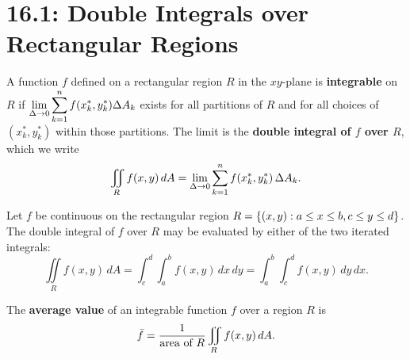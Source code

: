 \documentclass[mathNotesPreamble]{subfiles}
\begin{document}
\section{16.1: Double Integrals over Rectangular Regions}

  \begin{defn*}
    A function $f$ defined on a rectangular region $R$ in the $xy$-plane is \textbf{integrable} on $R$ if $\displaystyle\lim_{\Delta\to 0} \sum_{k=1}^n f(x_k^*, y_k^*) \Delta A_k$ exists for all partitions of $R$ and for all choices of $(x_k^*, y_k^*)$ within those partitions. The limit is the \textbf{double integral of $f$ over $R$}, which we write
      \[\iint\limits_R f(x,y)\,dA=\lim_{\Delta\to 0} \sum_{k=1}^n f(x_k^*, y_k^*)\,\Delta A_k.\]
  \end{defn*}

  \begin{thmBox*}
    Let $f$ be continuous on the rectangular region $R={\left\{(x,y):a\leq x\leq b, c\leq y \leq d\right\}}$. The double integral of $f$ over $R$ may be evaluated by either of the two iterated integrals:
      \[\iint\limits_R f(x,y)\,dA=\int_c^d\int_a^b f(x,y)\,dx\,dy=\int_a^b\int_c^d f(x,y)\,dy\,dx.\]
  \end{thmBox*}

  \begin{defn*}
    The \textbf{average value} of an integrable function $f$ over a region $R$ is
      \[\bar{f}=\frac{1}{\textnormal{area of }R}\iint\limits_R f(x,y)\,dA.\]
  \end{defn*}

  \pagebreak
  
\end{document}
